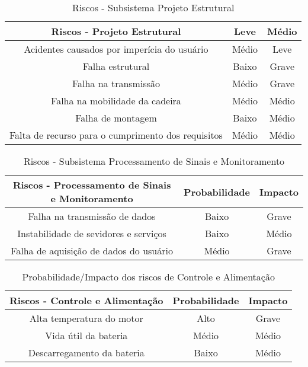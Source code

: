 \begin{table}[h]
\centering
\vspace{0.5cm}
\begin{tabular}{|c|c|c|}
\hline
Riscos - Projeto Estrutural    & Leve            & Médio          \\
\hline
Acidentes causados por imperícia do usuário         & Médio & Leve \\
Falha estrutural                                    & Baixo & Grave \\
Falha na transmissão                                & Médio & Grave \\
Falha na mobilidade da cadeira                      & Médio & Médio \\
Falha de montagem                                   & Baixo & Médio \\
Falta de recurso para o cumprimento dos requisitos  & Médio & Médio \\
\hline
\end{tabular}
\caption{Riscos - Subsistema Projeto Estrutural}
\label{tab:probimpest}
\end{table}

\begin{table}[h]
\centering
\vspace{0.5cm}
\begin{tabular}{|c|c|c|}
\hline
Riscos - Processamento de Sinais e Monitoramento       & Probabilidade & Impacto \\
\hline
Falha na transmissão de dados           & Baixo         & Grave \\
Instabilidade de sevidores e serviços   & Baixo         & Médio \\
Falha de aquisição de dados do usuário  & Médio         & Grave \\
\hline
\end{tabular}
\caption{Riscos - Subsistema Processamento de Sinais e Monitoramento}
\label{tab:probimpcontrole}
\end{table}

\begin{table}[h]
\centering
\vspace{0.5cm}
\begin{tabular}{|c|c|c|}
\hline
Riscos - Controle e Alimentação        & Probabilidade & Impacto \\
\hline
Alta temperatura do motor   & Alto          & Grave \\
Vida útil da bateria        & Médio         & Médio \\
Descarregamento da bateria  & Baixo         & Médio \\
\hline
\end{tabular}
\caption{Probabilidade/Impacto dos riscos de Controle e Alimentação}
\label{tab:probimpalim}
\end{table}

